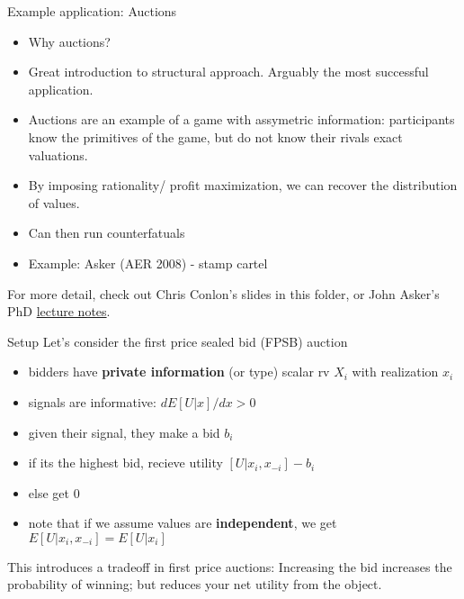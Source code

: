 \begin{frame}{Example application: Auctions}
  \begin{itemize}
    \item Why auctions? 
    \item Great introduction to structural approach. Arguably the most successful application. 
    \item Auctions are an example of a game with assymetric information: participants know the primitives of the game, but do not know their rivals exact valuations. 
    \item By imposing rationality/ profit maximization, we can recover the distribution of values. 
    \item Can then run counterfatuals
    \item Example: Asker (AER 2008) - stamp cartel 
\end{itemize}

For more detail, check out Chris Conlon's slides in this folder, or John Asker's PhD \href{http://www.johnasker.com}{lecture notes}.

\end{frame}

\begin{frame}{Setup}
Let's consider the first price sealed bid (FPSB) auction

\begin{itemize}
  \item bidders have \textbf{private information} (or type) scalar rv $X_i$ with realization $x_i$
  \item signals are informative: $dE[U|x]/dx >0$ 
  \item given their signal, they make a bid $b_i$
  \item if its the highest bid, recieve utility $[U| x_i,x_{-i}] - b_i$ 
  \item else get $0$
  \item note that if we assume values are \textbf{independent}, we get $E[U| x_i,x_{-i}]=E[U | x_i]$
\end{itemize}

This introduces a tradeoff in first price auctions: Increasing the bid increases the probability of winning; but reduces your net utility from the object.

\end{frame}

